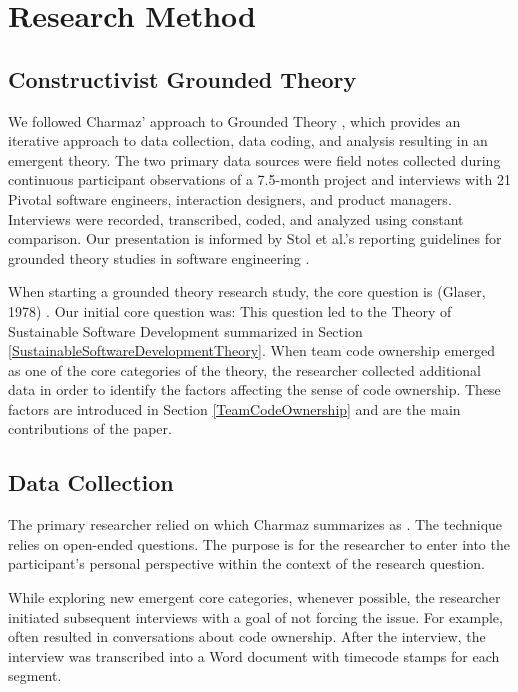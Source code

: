 \section{Research Method}
\label{ResearchMethod}

\subsection{Constructivist Grounded Theory}
We followed Charmaz' approach to Grounded Theory \cite{Charmaz}, which provides an iterative approach to data collection, data coding, and analysis resulting in an emergent theory. The two primary data sources were field notes collected during continuous participant observations of a 7.5-month project and interviews with 21 Pivotal software engineers, interaction designers, and product managers. Interviews were recorded, transcribed, coded, and analyzed using constant comparison. Our presentation is informed by Stol et al.'s reporting guidelines for grounded theory studies in software engineering \cite{StolGTinSE}. 

When starting a grounded theory research study, the core question is  (Glaser, 1978) \cite{GlaserTheoreticalSensitivity}. Our initial core question was:  This question led to the Theory of Sustainable Software Development summarized in Section \ref{SustainableSoftwareDevelopmentTheory}. When team code ownership emerged as one of the core categories of the theory, the researcher collected additional data in order to identify the factors affecting the sense of code ownership. These factors are introduced in Section \ref{TeamCodeOwnership} and are the main contributions of the paper.

\subsection{Data Collection}
The primary researcher relied on  which Charmaz summarizes as  \cite{Charmaz}. The technique relies on open-ended questions. The purpose is for the researcher to enter into the participant's personal perspective within the context of the research question. 

While exploring new emergent core categories, whenever possible, the researcher initiated subsequent interviews with a goal of not forcing the issue. For example,  often resulted in conversations about code ownership. After the interview, the interview was transcribed into a Word document with timecode stamps for each segment.

